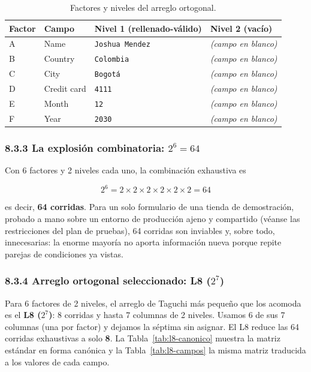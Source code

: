 \begingroup
\small
\renewcommand{\arraystretch}{1.2}
\begin{table}[htb]\centering\small
\caption{Factores y niveles del arreglo ortogonal.}\label{tab:factores}
\begin{tabularx}{\textwidth}{@{}>{\centering\arraybackslash}p{1.4cm} L{2.8cm} L{5.0cm} Y@{}}
\toprule
\textbf{Factor} & \textbf{Campo} & \textbf{Nivel 1 (rellenado-válido)} & \textbf{Nivel 2 (vacío)} \\
\midrule
A & Name & \texttt{Joshua Mendez} & \emph{(campo en blanco)} \\
B & Country & \texttt{Colombia} & \emph{(campo en blanco)} \\
C & City & \texttt{Bogotá} & \emph{(campo en blanco)} \\
D & Credit card & \texttt{4111} & \emph{(campo en blanco)} \\
E & Month & \texttt{12} & \emph{(campo en blanco)} \\
F & Year & \texttt{2030} & \emph{(campo en blanco)} \\
\bottomrule
\end{tabularx}
\end{table}
\endgroup

\subsubsection*{8.3.3 La explosión combinatoria: \texorpdfstring{$2^{6}=64$}{2\^{}6=64}}

Con 6 factores y 2 niveles cada uno, la combinación exhaustiva es

\[ 2^{6} = 2\times 2\times 2\times 2\times 2\times 2 = 64 \]

\noindent es decir, \textbf{64 corridas}. Para un solo formulario de una tienda de
demostración, probado a mano sobre un entorno de producción ajeno y compartido (véanse
las restricciones del plan de pruebas), 64 corridas son inviables y, sobre todo,
innecesarias: la enorme mayoría no aporta información nueva porque repite parejas de
condiciones ya vistas.

\subsubsection*{8.3.4 Arreglo ortogonal seleccionado: \texorpdfstring{L8 ($2^{7}$)}{L8 (2\^{}7)}}

Para 6 factores de 2 niveles, el arreglo de Taguchi más pequeño que los acomoda es el
\textbf{L8 ($2^{7}$)}: 8 corridas y hasta 7 columnas de 2 niveles. Usamos 6 de sus 7
columnas (una por factor) y dejamos la séptima sin asignar. El L8 reduce las 64
corridas exhaustivas a solo \textbf{8}. La Tabla~\ref{tab:l8-canonico} muestra la
matriz estándar en forma canónica y la Tabla~\ref{tab:l8-campos} la misma matriz
traducida a los valores de cada campo.

